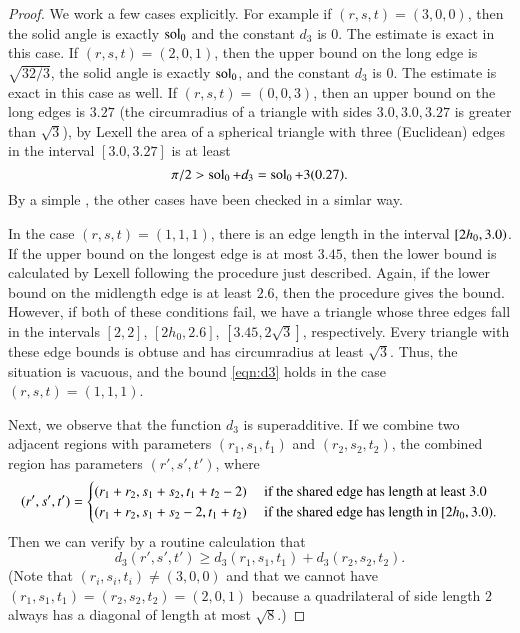 \documentclass{llncs}
\begin{document}
\begin{proof}
We work a few cases explicitly.
For example if $(r,s,t)=(3,0,0)$, then the solid angle is exactly $\operatorname{sol}_0$ and the constant $d_3$ is $0$.
The estimate is exact in this case.
If $(r,s,t)=(2,0,1)$, then the upper bound on the long edge is $\sqrt{32/3}$, the solid angle is exactly
$\operatorname{sol}_0$, and the constant $d_3$ is $0$.  The estimate is exact in this case as well.
If $(r,s,t)=(0,0,3)$, then an upper bound on the long edges is $3.27$ (the circumradius of a triangle
with sides $3.0,3.0,3.27$ is greater than $\sqrt3$), by Lexell the area of a spherical triangle with three (Euclidean) edges
in the interval $[3.0,3.27]$ is at least 
\[
\pi/2 > \operatorname{sol}_0 + d_3 = \operatorname{sol}_0 + 3 (0.27).
\]
By a simple , 
the other cases have been checked in a simlar way.


In the case $(r,s,t)=(1,1,1)$, there is an edge length in the interval $[ 2 h_0,3.0)$.
If the upper bound on the longest edge is at most $3.45$, then the lower bound is calculated by Lexell
following the procedure just described.  Again, if the lower bound on the midlength edge
is at least $2.6$, then the procedure gives the bound.  However, if both of these conditions fail, we
have a triangle whose three edges fall in the intervals $[2,2]$, $[2h_0,2.6]$, $[3.45,2\sqrt3]$,
respectively.  Every
triangle with these edge bounds is obtuse and
has circumradius at least $\sqrt3$.  Thus, the situation is vacuous, and the bound \eqref{eqn:d3}
holds in the case $(r,s,t)=(1,1,1)$.


Next, we observe that the function $d_3$ is superadditive.  If we combine two adjacent regions with parameters
$(r_1,s_1,t_1)$ and $(r_2,s_2,t_2)$, the combined region has parameters $(r',s',t')$, where
\[
(r',s',t') =
\begin{cases} (r_1+r_2,s_1+s_2,t_1+t_2-2) &\text{ if the shared edge has length at least } 3.0\\
(r_1+r_2,s_1+s_2-2,t_1+t_2) &\text{ if the shared edge has length in } [ 2h_0,3.0).
\end{cases}
\]
Then we can verify by a routine calculation that
\[
d_3(r',s',t') \ge d_3(r_1,s_1,t_1) + d_3(r_2,s_2,t_2).
\]
(Note that $(r_i,s_i,t_i)\ne (3,0,0)$ and that we cannot have $(r_1,s_1,t_1)=(r_2,s_2,t_2)=(2,0,1)$ because
a quadrilateral of side length $2$ always has a diagonal of length at most $\sqrt8$.)




\end{proof}
\end{document}
